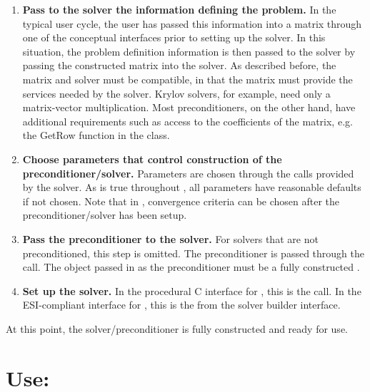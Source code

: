 \begin{enumerate}

\item
{\bf Pass to the solver the information defining the problem.} In the
typical user cycle, the user has passed this information into a matrix
through one of the conceptual interfaces prior to setting up the
solver. In this situation, the problem definition information is then
passed to the solver by passing the constructed matrix into the
solver. As described before, the matrix and solver must be compatible,
in that the matrix must provide the services needed by the
solver. Krylov solvers, for example, need only a matrix-vector
multiplication.  Most preconditioners, on the other hand, have
additional requirements such as access to the coefficients of the
matrix, e.g. the GetRow function in the
 class.

\item
{\bf Choose parameters that control construction of the
preconditioner/solver.}  Parameters are chosen through the 
calls provided by the solver.  As is true throughout \hypre{}, all
parameters have reasonable defaults if not chosen.  Note that in
\hypre{}, convergence criteria can be chosen after the
preconditioner/solver has been setup.

\item
{\bf Pass the preconditioner to the solver.} For solvers that are not
preconditioned, this step is omitted. The preconditioner is passed
through the  call. The object passed in as the
preconditioner must be a fully constructed .

\item
{\bf Set up the solver.} In the procedural C interface for \hypre{},
this is the  call.  In the ESI-compliant interface for
\hypre{}, this is the  from the solver
builder interface.

\end{enumerate}

At this point, the solver/preconditioner is fully constructed and
ready for use.


\section*{Use:}

